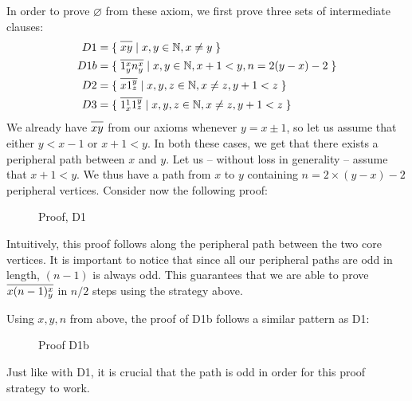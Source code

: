In order to prove $\varnothing$ from these axiom, we first prove three sets of intermediate clauses:
\begin{align}
  D1 &= \{\; \ol{xy} \;|\; x,y \in \mathbb{N}, x \neq y \; \} \\
  D1b &= \{\; \ol{1^x_yn^x_y} \;|\; x,y \in \mathbb{N}, x+1 < y, n = 2(y-x)-2 \; \} \\
  D2 &= \{\; \ol{x1^y_z} \;|\; x,y,z \in \mathbb{N}, x \neq z, y+1 < z \; \} \\
  D3 &= \{\; \ol{1^1_x1^y_z} \;|\; x,y,z \in \mathbb{N}, x \neq z, y+1 < z \; \}
\end{align}
We already have $\ol{xy}$ from our axioms whenever $y = x \pm 1$, so let us assume that either $y < x-1$ or $x + 1 < y$.
In both these cases, we get that there exists a peripheral path between $x$ and $y$.
Let us -- without loss in generality -- assume that $x + 1 < y$.
We thus have a path from $x$ to $y$ containing $n = 2 \times (y - x) - 2$ peripheral vertices.
Consider now the following proof:\par
\begin{figure}[!h]
  \centering
  \begin{prooftree*}
  \end{prooftree*}
  \caption{Proof, D1}
  \label{fig:proof_d1}
\end{figure}
\FloatBarrier
Intuitively, this proof follows along the peripheral path between the two core vertices.
It is important to notice that since all our peripheral paths are odd in length, $(n-1)$ is always odd.
This guarantees that we are able to prove $\ol{x(n-1)^x_y}$ in $n/2$ steps using the strategy above.

Using $x,y,n$ from above, the proof of D1b follows a similar pattern as D1:\par
\begin{figure}[!h]
  \centering
  \begin{prooftree*}
  \end{prooftree*}
  \caption{Proof D1b}
  \label{fig:proof_d1b}
\end{figure}
Just like with D1, it is crucial that the path is odd in order for this proof strategy to work.

